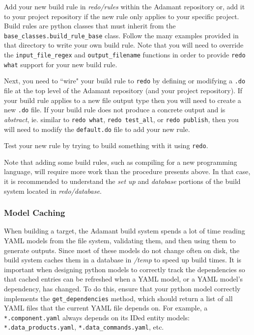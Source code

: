 \vspace{5mm} %
\begin{spacedenumerate}
  \item Add your new build rule in \textit{redo/rules} within the Adamant repository or, add it to your project repository if the new rule only applies to your specific project. Build rules are python classes that must inherit from the \texttt{base\_classes.build\_rule\_base} class. Follow the many examples provided in that directory to write your own build rule. Note that you will need to override the \texttt{input\_file\_regex} and \texttt{output\_filename} functions in order to provide \texttt{redo what} support for your new build rule.
  \item Next, you need to ``wire" your build rule to \texttt{redo} by defining or modifying a \texttt{.do} file at the top level of the Adamant repository (and your project repository). If your build rule applies to a new file output type then you will need to create a new \texttt{.do} file. If your build rule does not produce a concrete output and is \textit{abstract}, ie. similar to \texttt{redo what}, \texttt{redo test\_all}, or \texttt{redo publish}, then you will need to modify the \texttt{default.do} file to add your new rule. 
  \item Test your new rule by trying to build something with it using \texttt{redo}.
\end{spacedenumerate}
\vspace{5mm} %

Note that adding some build rules, such as compiling for a new programming language, will require more work than the procedure presents above. In that case, it is recommended to understand the \textit{set up} and \textit{database} portions of the build system located in \textit{redo/database}.

\subsubsection{Model Caching} \label{The Model Cache}

When building a target, the Adamant build system spends a lot of time reading YAML models from the file system, validating them, and then using them to generate outputs. Since most of these models do not change often on disk, the build system caches them in a database in \textit{/temp} to speed up build times. It is important when designing python models to correctly track the dependencies so that cached entries can be refreshed when a YAML model, or a YAML model's dependency, has changed. To do this, ensure that your python model correctly implements the \texttt{get\_dependencies} method, which should return a list of all YAML files that the current YAML file depends on. For example, a \texttt{*.component.yaml} always depends on its IDed entity models: \texttt{*.data\_products.yaml}, \texttt{*.data\_commands.yaml}, etc. \\

